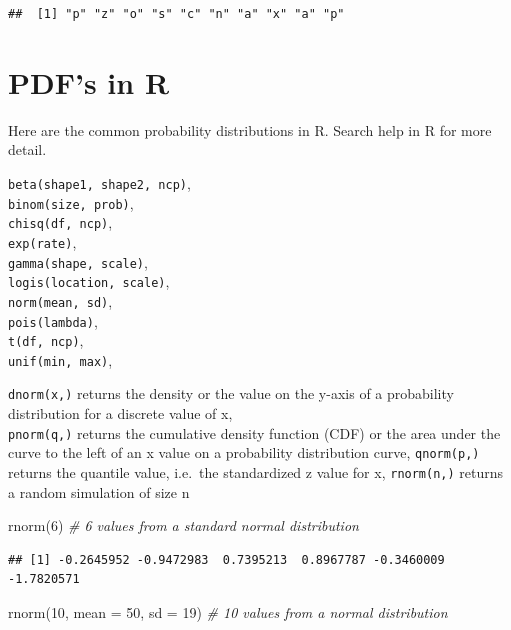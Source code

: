 \documentclass[
]{book}
\newenvironment{Shaded}{\begin{snugshade}}{\end{snugshade}}
\newcommand{\AttributeTok}[1]{\textcolor[rgb]{0.77,0.63,0.00}{#1}}
\newcommand{\CommentTok}[1]{\textcolor[rgb]{0.56,0.35,0.01}{\textit{#1}}}
\newcommand{\DecValTok}[1]{\textcolor[rgb]{0.00,0.00,0.81}{#1}}
\newcommand{\FunctionTok}[1]{\textcolor[rgb]{0.00,0.00,0.00}{#1}}
\newcommand{\NormalTok}[1]{#1}
\begin{document}
\begin{verbatim}
##  [1] "p" "z" "o" "s" "c" "n" "a" "x" "a" "p"
\end{verbatim}

\hypertarget{pdfs-in-r}{%
\section{PDF's in R}\label{pdfs-in-r}}

Here are the common probability distributions in R. Search help in R for more detail.

\texttt{beta(shape1,\ shape2,\ ncp)},\\
\texttt{binom(size,\ prob)},\\
\texttt{chisq(df,\ ncp)},\\
\texttt{exp(rate)},\\
\texttt{gamma(shape,\ scale)},\\
\texttt{logis(location,\ scale)},\\
\texttt{norm(mean,\ sd)},\\
\texttt{pois(lambda)},\\
\texttt{t(df,\ ncp)},\\
\texttt{unif(min,\ max)},

\texttt{dnorm(x,)} returns the density or the value on the y-axis of a probability distribution for a discrete value of x,\\
\texttt{pnorm(q,)} returns the cumulative density function (CDF) or the area under the curve to the left of an x value on a probability distribution curve,
\texttt{qnorm(p,)} returns the quantile value, i.e.~the standardized z value for x,
\texttt{rnorm(n,)} returns a random simulation of size n

\begin{Shaded}
\begin{Highlighting}[]
\FunctionTok{rnorm}\NormalTok{(}\DecValTok{6}\NormalTok{) }\CommentTok{\#  6 values from a standard normal distribution}
\end{Highlighting}
\end{Shaded}

\begin{verbatim}
## [1] -0.2645952 -0.9472983  0.7395213  0.8967787 -0.3460009 -1.7820571
\end{verbatim}

\begin{Shaded}
\begin{Highlighting}[]
\FunctionTok{rnorm}\NormalTok{(}\DecValTok{10}\NormalTok{, }\AttributeTok{mean =} \DecValTok{50}\NormalTok{, }\AttributeTok{sd =} \DecValTok{19}\NormalTok{) }\CommentTok{\# 10 values from a normal distribution}
\end{Highlighting}
\end{Shaded}
\end{document}
